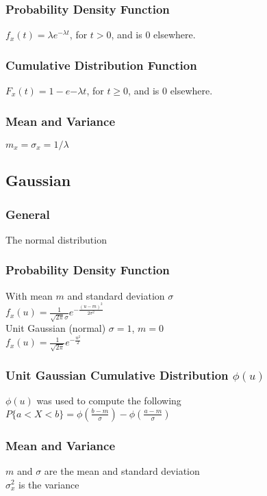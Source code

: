 \subsubsection*{Probability Density Function}
$f_x(t) = \lambda e^{-\lambda t}$, for $t>0$, and is $0$ elsewhere.

\subsubsection*{Cumulative Distribution Function}
$F_x(t) = 1-e{-\lambda t}$, for $t\geq0$, and is $0$ elsewhere.

\subsubsection*{Mean and Variance}
$m_x=\sigma_x=1/\lambda$
    
\subsection*{Gaussian }

\subsubsection*{General}
The normal distribution

\subsubsection*{Probability Density Function}
With mean $m$ and standard deviation $\sigma$ \\
$f_x(u)=\frac{1}{\sqrt{2\pi}\sigma}e^{-\frac{(u-m)^2}{2\sigma^2}}$ \\
Unit Gaussian (normal) $\sigma = 1$, $m=0$ \\
$f_x(u)=\frac{1}{\sqrt{2\pi}}e^{-\frac{u^2}{2}}$

\subsubsection*{Unit Gaussian Cumulative Distribution $\phi(u)$}
$\phi(u)$ was used to compute the following \\
$P\{a<X<b\}=\phi(\frac{b-m}{\sigma})-\phi(\frac{a-m}{\sigma})$

\subsubsection*{Mean and Variance}
$m$ and $\sigma$ are the mean and standard deviation \\
$\sigma_x^2$ is the variance
    

